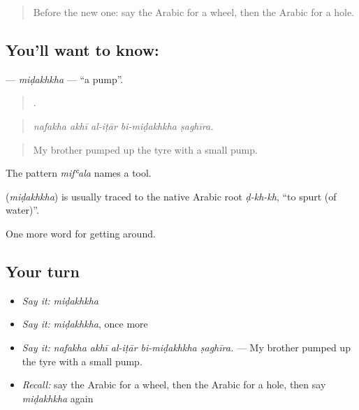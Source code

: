 \label{lesson:AR-C433-midakhkha}



\begin{quote}
Before the new one: say the Arabic for a wheel, then the Arabic for a hole.
\end{quote}

\subsection*{You'll want to know: }
\textbf{} — \emph{miḍakhkha} — \textquotedblleft{}a pump\textquotedblright{}.

\begin{quote}
    .
\end{quote}

\begin{quote}
\emph{nafakha akhī al-iṭār bi-miḍakhkha ṣaghīra.}
\end{quote}

\begin{quote}
My brother pumped up the tyre with a small pump.
\end{quote}

The pattern \emph{mifʿala} names a tool.

\begin{cousinweb}
\textbf{} (\emph{miḍakhkha}) is usually traced to the native Arabic root \emph{ḍ-kh-kh}, \textquotedblleft{}to spurt (of water)\textquotedblright{}.
\end{cousinweb}

\begin{grammarlens}[title={What you've built}]
One more word for getting around.
\end{grammarlens}

\subsection*{Your turn}
\begin{itemize}
\raggedright
  \item \emph{Say it:} \emph{miḍakhkha}
  \item \emph{Say it:} \emph{miḍakhkha}, once more
  \item \emph{Say it:} \emph{nafakha akhī al-iṭār bi-miḍakhkha ṣaghīra.} — My brother pumped up the tyre with a small pump.
  \item \emph{Recall:} say the Arabic for a wheel, then the Arabic for a hole, then say \emph{miḍakhkha} again
\end{itemize}

